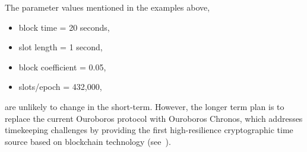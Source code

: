 The parameter values mentioned in the examples above,
\begin{itemize}[noitemsep]
  \item block time = 20 seconds,
  \item slot length = 1 second,
  \item block coefficient = 0.05,
  \item slots/epoch = 432,000,
\end{itemize}
are unlikely to change in the short-term.  However, the longer term plan is to replace the current Ouroboros  protocol with Ouroboros Chronos, which addresses timekeeping challenges by providing the first
high-resilience cryptographic time source based on blockchain technology (see~\textcite{www-iohk-blog-ouroboros}).
